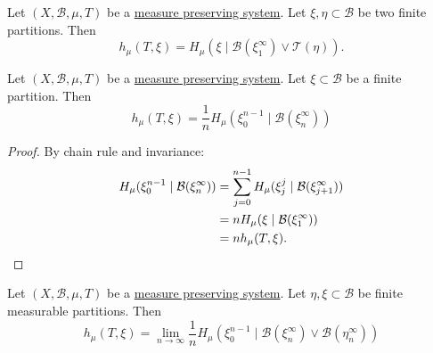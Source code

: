 \documentclass{article}
\begin{document}
\begin{prop}
  Let $(X, \mathcal{B}, \mu, T)$ be a \hyperlink{def:mps}{measure preserving system}. Let $\xi,\eta \subset \mathcal{B}$ be two finite partitions.
  Then
  \begin{equation*}
    h_\mu(T, \xi) = H_\mu(\xi \mid \mathcal{B}(\xi_1^\infty) \lor \mathcal{T}(\eta)).
  \end{equation*}
\end{prop}
\begin{lemma}
  Let $(X, \mathcal{B}, \mu, T)$ be a \hyperlink{def:mps}{measure preserving system}. Let $\xi \subset \mathcal{B}$ be a finite partition.
  Then
  \begin{equation*}
    h_\mu(T, \xi) = \frac{1}{n} H_\mu(\xi_0^{n-1} \mid \mathcal{B}(\xi_n^\infty))
  \end{equation*}
\end{lemma}
\begin{proof}
  By chain rule and invariance:
  \begin{align*}
    H_\mu(\xi_0^{n-1} \mid \mathcal{B}(\xi_n^\infty)) &= \sum_{j=0}^{n-1} H_\mu(\xi_j^j \mid \mathcal{B}(\xi_{j+1}^\infty)) \\
                                                      &= n H_\mu(\xi \mid \mathcal{B}(\xi_1^\infty)) \\
                                                      &= n h_\mu(T, \xi). \qedhere
  \end{align*}
\end{proof}
\begin{lemma}
  Let $(X, \mathcal{B}, \mu, T)$ be a \hyperlink{def:mps}{measure preserving system}.
  Let $\eta, \xi \subset \mathcal{B}$ be finite measurable partitions.
  Then
  \begin{equation*}
    h_\mu(T, \xi) = \lim_{n \to \infty} \frac{1}{n} H_\mu(\xi_0^{n-1} \mid \mathcal{B}(\xi_n^\infty) \vee \mathcal{B}(\eta_n^\infty))
  \end{equation*}
\end{lemma}
\end{document}
